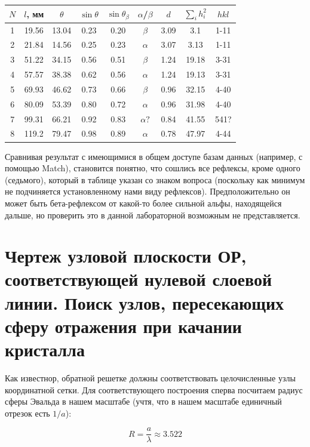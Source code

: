 \documentclass[a4paper, 12pt]{article}
\begin{document}
\begin{table}[H]
	\centering
	\begin{tabular}{|c|c|c|c|c|c|c|c|c|}
		\hline
		$N$ & $l$, мм & $\theta$ & $\sin\theta$ & $\sin\theta_\beta$ & $\alpha$/$\beta$ & $d$ & $\sum\limits_i h_i^2$ & $hkl$ \\
		\hline
		1 & 19.56 & 13.04 & 0.23 & 0.20 & $\beta$ & 3.09 & 3.1 & 1-11 \\
		\hline
		2 & 21.84 & 14.56 & 0.25 & 0.23 & $\alpha$ & 3.07 & 3.13 & 1-11 \\
		\hline
		3 & 51.22 & 34.15 & 0.56 & 0.51 & $\beta$ & 1.24 & 19.18 & 3-31 \\
		\hline
		4 & 57.57 & 38.38 & 0.62 & 0.56 & $\alpha$ & 1.24 & 19.13 & 3-31 \\
		\hline
		5 & 69.93 & 46.62 & 0.73 & 0.66 & $\beta$ & 0.96 & 32.15 & 4-40 \\
		\hline
		6 & 80.09 & 53.39 & 0.80 & 0.72 & $\alpha$ & 0.96 & 31.98 & 4-40 \\
		\hline
		7 & 99.31 & 66.21 & 0.92 & 0.83 & $\alpha?$ & 0.84 & 41.55 & 541? \\
		\hline
		8 & 119.2 & 79.47 & 0.98 & 0.89 & $\alpha$ & 0.78 & 47.97 & 4-44 \\
		\hline
	\end{tabular}
\end{table}

Сравнивая результат с имеющимися в общем доступе базам данных (например, с помощью Match), становится понятно, что сошлись все рефлексы, кроме одного (седьмого), который в таблице указан со знаком вопроса (поскольку как минимум не подчиняется установленному нами виду рефлексов). Предположительно он может быть бета-рефлексом от какой-то более сильной альфы, находящейся дальше, но проверить это в данной лабораторной возможным не представляется.

\section{Чертеж узловой плоскости ОР, соответствующей нулевой слоевой линии. Поиск узлов, пересекающих сферу отражения при качании кристалла}

Как известнор, обратной решетке должны соответствовать целочисленные узлы координатной сетки. Для соответствующего построения сперва посчитаем радиус сферы Эвальда в нашем масштабе (учтя, что в нашем масштабе единичный отрезок есть $1/a$):

\begin{equation}
	R = \frac{a}{\lambda} \approx 3.522
	\label{eq:R}
\end{equation}
\end{document}
